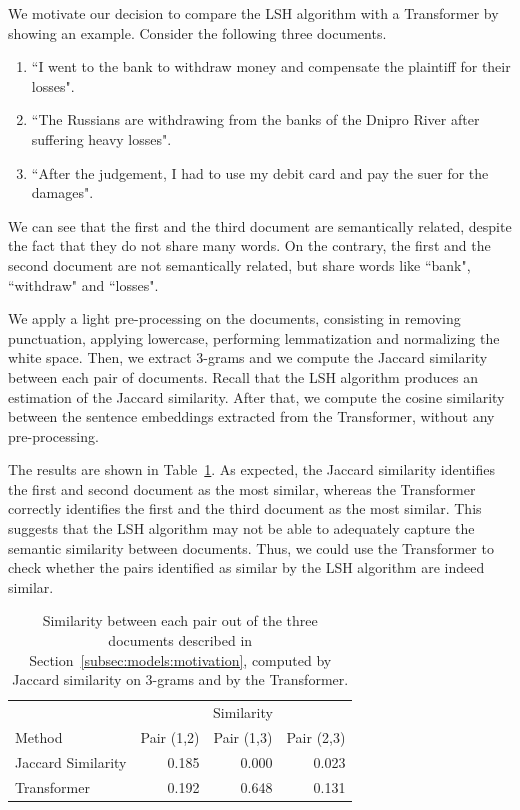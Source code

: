 \documentclass[runningheads]{llncs}
\begin{document}
We motivate our decision to compare the LSH algorithm with a Transformer by showing an example. Consider the following three documents.
\begin{enumerate}
  \item “I went to the bank to withdraw money and compensate the plaintiff for their losses".
  \item “The Russians are withdrawing from the banks of the Dnipro River after suffering heavy losses".
  \item “After the judgement, I had to use my debit card and pay the suer for the damages".
\end{enumerate}
We can see that the first and the third document are semantically related, despite the fact that they do not share many words. On the contrary, the first and the second document are not semantically related, but share words like “bank", “withdraw" and “losses".

We apply a light pre-processing on the documents, consisting in removing punctuation, applying lowercase, performing lemmatization and normalizing the white space. Then, we extract 3-grams and we compute the Jaccard similarity between each pair of documents. Recall that the LSH algorithm produces an estimation of the Jaccard similarity. After that, we compute the cosine similarity between the sentence embeddings extracted from the Transformer, without any pre-processing.

The results are shown in Table~\ref{tab:models:comparison}. As expected, the Jaccard similarity identifies the first and second document as the most similar, whereas the Transformer correctly identifies the first and the third document as the most similar. This suggests that the LSH algorithm may not be able to adequately capture the semantic similarity between documents. Thus, we could use the Transformer to check whether the pairs identified as similar by the LSH algorithm are indeed similar.

\begin{table}
  \caption{Similarity between each pair out of the three documents described in Section~\ref{subsec:models:motivation}, computed by Jaccard similarity on 3-grams and by the Transformer.}
  \label{tab:models:comparison}
  \centering
  \begin{tabular}{lrrr}
      \toprule
      & \multicolumn{3}{c}{Similarity} \\
      \cmidrule{2-4}
      Method & Pair (1,2) & Pair (1,3) & Pair (2,3) \\
      \midrule
      Jaccard Similarity & 0.185 & 0.000 & 0.023\\
      Transformer & 0.192 & 0.648 & 0.131 \\
      \bottomrule
  \end{tabular}
\end{table}
\end{document}
